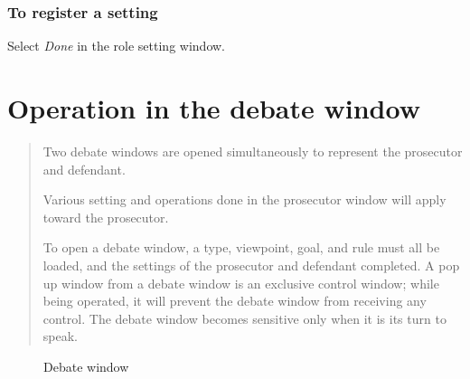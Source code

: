 \subsubsection{To register a setting}
Select {\sl Done} in the role setting window.

%
%

\section{Operation in the debate window}
\begin{quotation}
Two debate windows are opened simultaneously to represent the prosecutor and defendant.

Various setting and operations done in the prosecutor window will apply toward the prosecutor.

To open a debate window, a type, viewpoint, goal, and rule must all be loaded, and the settings of the prosecutor and defendant completed. A pop up window from a debate window is an exclusive control window; while being operated, it will prevent the debate window from receiving any control.
The debate window becomes sensitive only when it is its turn to speak.

\end{quotation}

\begin{figure}[htb]
\begin{center}
\end{center}
\caption{Debate window}\label{Debate window}
\end{figure}


